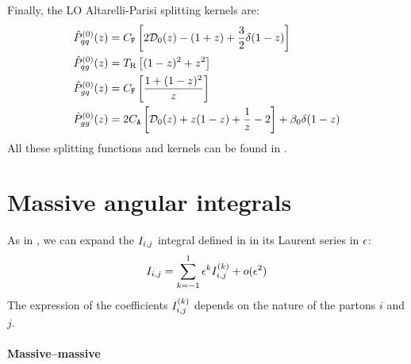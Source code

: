 Finally, the LO Altarelli-Parisi splitting kernels are:
\begin{align}
  \hat{P}^{(0)}_{qq}(z) & = C_\mathtt{F} \left[ 2 \mathcal{D}_0(z) - (1 + z) + \frac{3}{2} \delta(1 - z) \right] \\
  \hat{P}^{(0)}_{qg}(z) & = T_\text{R} \left[ (1 - z)^2 + z^2 \right] \\
  \hat{P}^{(0)}_{gq}(z) & = C_\mathtt{F} \left[ \frac{1 + (1 - z)^2}{z} \right] \\
  \hat{P}^{(0)}_{gg}(z) & = 2 C_\mathtt{A} \left[ \mathcal{D}_0(z) + z (1 - z) + \frac{1}{z} - 2 \right] + \beta_0 \delta(1 - z)
\end{align}
All these splitting functions and kernels can be found in \cite{Ellis-1996}.

\section{Massive angular integrals}
\label{sec:mass-int}

As in \cite{Behring-2020}, we can expand the $ I_{i,j} $ integral defined in  in its Laurent series in $ \epsilon $:
\begin{equation}
  I_{i,j} = \sum_{k = -1}^1 \epsilon^k I_{i,j}^{(k)} + o(\epsilon^2)
\end{equation}
The expression of the coefficients $ I_{i,j}^{(k)} $ depends on the nature of the partons $ i $ and $ j $.

\paragraph{Massive--massive}


